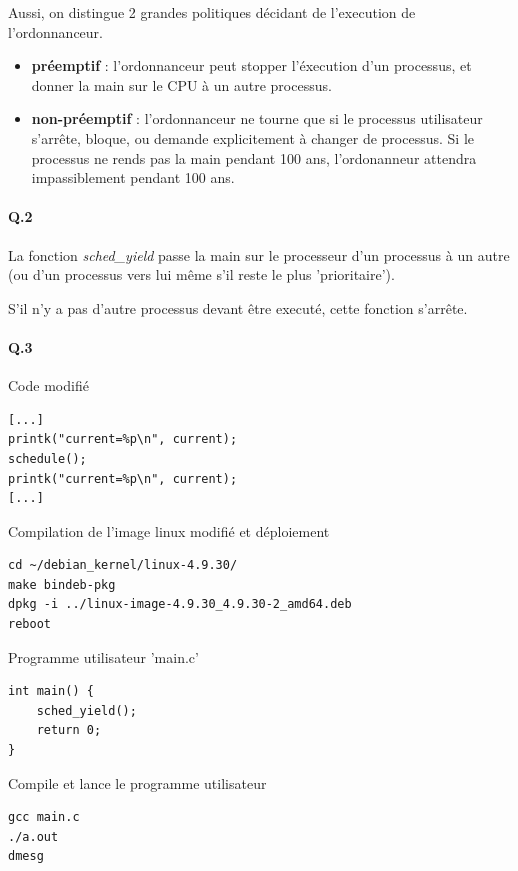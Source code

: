 \documentclass[10pt]{article}
\begin{document}
        
        Aussi, on distingue 2 grandes politiques décidant de l'execution de l'ordonnanceur.
        \begin{itemize}
            \item \textbf{préemptif} : l'ordonnanceur peut stopper l'éxecution d'un processus,
            et donner la main sur le CPU à un autre processus.
            \item \textbf{non-préemptif} : l'ordonnanceur ne tourne que si le processus utilisateur
            s'arrête, bloque, ou demande explicitement à changer de processus.
            Si le processus ne rends pas la main pendant 100 ans, l'ordonanneur attendra impassiblement pendant 100 ans.

        \end{itemize}

        
        \paragraph{Q.2}
        La fonction \textit{sched\_yield} passe la main sur le processeur d'un processus à un autre
        (ou d'un processus vers lui même s'il reste le plus 'prioritaire').
        
        S'il n'y a pas d'autre processus devant être executé, cette fonction s'arrête.
        
        \paragraph{Q.3}
        Code modifié
        \lstset{language=C}
\begin{lstlisting}[frame=single]
[...]
printk("current=%p\n", current);
schedule();
printk("current=%p\n", current);
[...]
\end{lstlisting}

        Compilation de l'image linux modifié et déploiement
\lstset{language=bash}
\begin{lstlisting}[frame=single]
cd ~/debian_kernel/linux-4.9.30/
make bindeb-pkg
dpkg -i ../linux-image-4.9.30_4.9.30-2_amd64.deb
reboot
\end{lstlisting}

Programme utilisateur 'main.c'
\lstset{language=C}
\begin{lstlisting}[frame=single]
int main() {
    sched_yield();
    return 0;
}
\end{lstlisting}

Compile et lance le programme utilisateur
\begin{lstlisting}[frame=single]
gcc main.c
./a.out
dmesg
\end{lstlisting}
\end{document}
